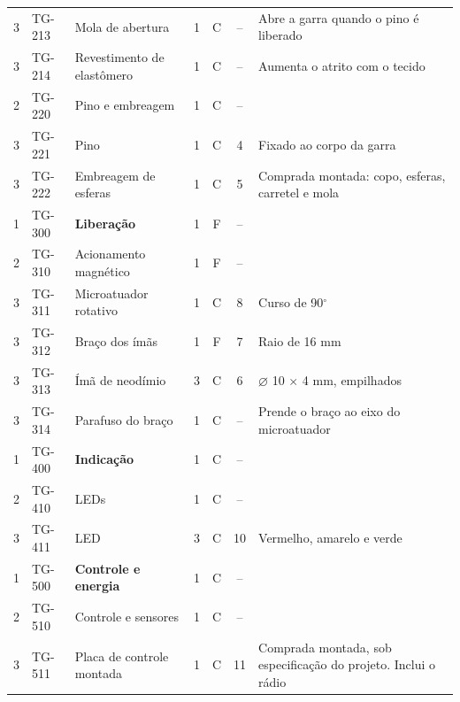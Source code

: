 \begin{longtable}{@{}c l >{\RaggedRight\arraybackslash}p{4.5cm} c c c >{\RaggedRight\arraybackslash}p{4.3cm}@{}}
    3 & TG-213 & \hspace{0.6cm}Mola de abertura & 1 & C & -- & Abre a garra quando o pino é liberado \\
    3 & TG-214 & \hspace{0.6cm}Revestimento de elastômero & 1 & C & -- & Aumenta o atrito com o tecido \\
    2 & TG-220 & \hspace{0.3cm}Pino e embreagem & 1 & C & -- & \\
    3 & TG-221 & \hspace{0.6cm}Pino & 1 & C & 4 & Fixado ao corpo da garra \\
    3 & TG-222 & \hspace{0.6cm}Embreagem de esferas & 1 & C & 5 & Comprada montada: copo, esferas, carretel e mola \\
    \midrule
    1 & TG-300 & \textbf{Liberação} & 1 & F & -- & \\
    2 & TG-310 & \hspace{0.3cm}Acionamento magnético & 1 & F & -- & \\
    3 & TG-311 & \hspace{0.6cm}Microatuador rotativo & 1 & C & 8 & Curso de 90$^\circ$ \\
    3 & TG-312 & \hspace{0.6cm}Braço dos ímãs & 1 & F & 7 & Raio de 16 mm \\
    3 & TG-313 & \hspace{0.6cm}Ímã de neodímio & 3 & C & 6 & $\varnothing$ 10 $\times$ 4 mm, empilhados \\
    3 & TG-314 & \hspace{0.6cm}Parafuso do braço & 1 & C & -- & Prende o braço ao eixo do microatuador \\
    \midrule
    1 & TG-400 & \textbf{Indicação} & 1 & C & -- & \\
    2 & TG-410 & \hspace{0.3cm}LEDs & 1 & C & -- & \\
    3 & TG-411 & \hspace{0.6cm}LED & 3 & C & 10 & Vermelho, amarelo e verde \\
    \midrule
    1 & TG-500 & \textbf{Controle e energia} & 1 & C & -- & \\
    2 & TG-510 & \hspace{0.3cm}Controle e sensores & 1 & C & -- & \\
    3 & TG-511 & \hspace{0.6cm}Placa de controle montada & 1 & C & 11 & Comprada montada, sob especificação do projeto. Inclui o rádio \\

\end{longtable}

